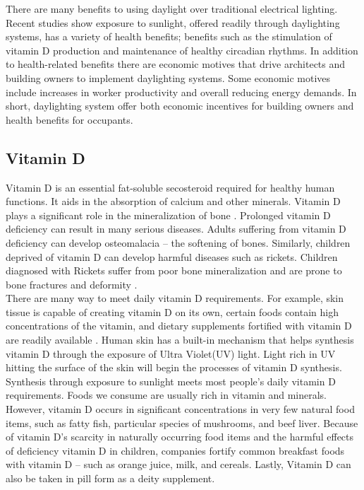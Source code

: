 There are many benefits to using daylight over traditional electrical lighting.  Recent studies show exposure to sunlight, offered readily through daylighting systems, has a variety of health benefits; benefits such as the stimulation of vitamin D production and maintenance of healthy circadian rhythms.  In addition to health-related benefits there are economic motives that drive architects and building owners to implement daylighting systems.  Some economic motives include increases in worker productivity and overall reducing energy demands.  In short, daylighting system offer both economic incentives for building owners and health benefits for occupants. \\

\subsection{Vitamin D}
Vitamin D is an essential fat-soluble secosteroid required for healthy human functions. It aids in the absorption of calcium and other minerals. Vitamin D plays a significant role in the mineralization of bone \cite{Ross}. Prolonged vitamin D deficiency can result in many serious diseases.  Adults suffering from vitamin D deficiency can develop osteomalacia -- the softening of bones. Similarly, children deprived of vitamin D can develop harmful diseases such as rickets. Children diagnosed with Rickets suffer from poor bone mineralization and are prone to bone fractures and deformity \cite{Pettifor}. \\ 

There are many way to meet daily vitamin D requirements. For example, skin tissue is capable of creating vitamin D on its own, certain foods contain high concentrations of the vitamin, and dietary supplements fortified with vitamin D are readily available \cite{Ross}.  Human skin has a built-in mechanism that helps synthesis vitamin D through the exposure of Ultra Violet(UV) light. Light rich in UV hitting the surface of the skin will begin the processes of vitamin D synthesis. Synthesis through exposure to sunlight meets most people's daily vitamin D requirements. Foods we consume are usually rich in vitamin and minerals. However, vitamin D occurs in significant concentrations in very few natural food items, such as fatty fish, particular species of mushrooms, and beef liver.  Because of vitamin D's scarcity in naturally occurring food items and the harmful effects of deficiency vitamin D  in children, companies fortify common breakfast foods with vitamin D -- such as orange juice, milk, and cereals. Lastly, Vitamin D can also be taken in pill form as a deity supplement. \\

